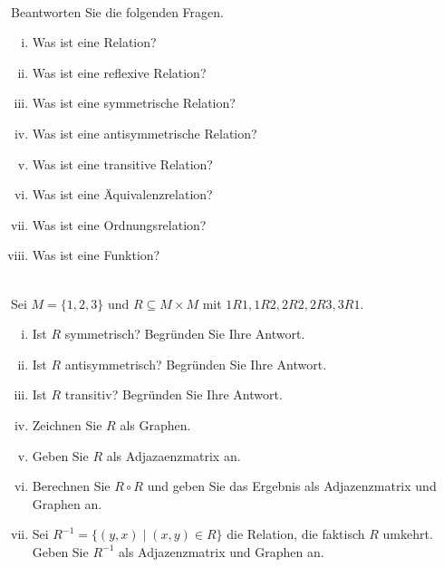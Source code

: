 \\
Beantworten Sie die folgenden Fragen.
\begin{enumerate}[(i)]
    \item Was ist eine Relation?
    \item Was ist eine reflexive Relation?
    \item Was ist eine symmetrische Relation?
    \item Was ist eine antisymmetrische Relation?
    \item Was ist eine transitive Relation?
    \item Was ist eine Äquivalenzrelation?
    \item Was ist eine Ordnungsrelation?
    \item Was ist eine Funktion?
\end{enumerate}

\\
Sei $M=\{1,2,3\}$ und $R\subseteq M\times M$ mit $1R1, 1R2, 2R2, 2R3, 3R1$.
\begin{enumerate}[(i)]
    \item Ist $R$ symmetrisch? Begründen Sie Ihre Antwort.
    \item Ist $R$ antisymmetrisch? Begründen Sie Ihre Antwort.
    \item Ist $R$ transitiv? Begründen Sie Ihre Antwort.
    \item Zeichnen Sie $R$ als Graphen.
    \item Geben Sie $R$ als Adjazaenzmatrix an.
    \item Berechnen Sie $R\circ R$ und geben Sie das Ergebnis als Adjazenzmatrix und Graphen an.
    \item Sei $R^{-1}=\{(y,x)\mid (x,y)\in R\}$ die Relation, die faktisch $R$ umkehrt. Geben Sie $R^{-1}$ als Adjazenzmatrix und Graphen an.
\end{enumerate}
